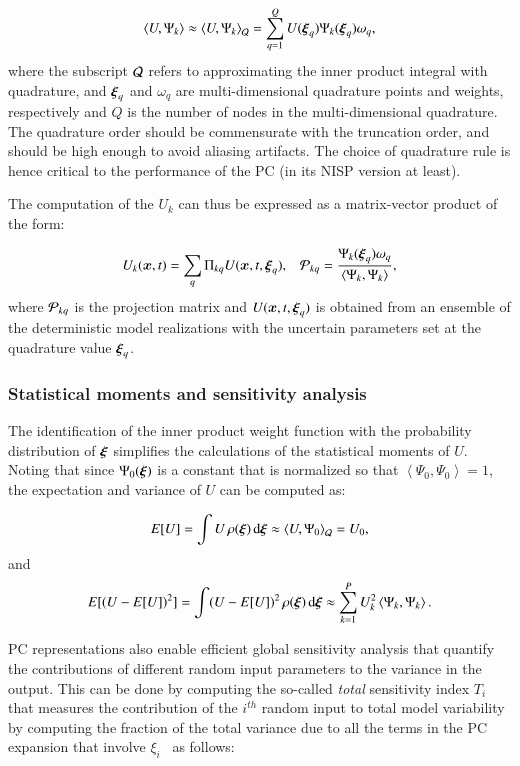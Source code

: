 \begin{equation}
  \left< U, \Psi_k \right> 
\approx \left< U, \Psi_k \right>_{\cal Q}
= \sum_{q=1}^{Q} U(\xxi_q) \Psi_k(\xxi_q) \omega_q,
\end{equation}
where the subscript $\cal Q$ refers to approximating the inner product integral with
quadrature, and $\xxi_q$ and $\omega_q$ are multi-dimensional quadrature points and weights,
respectively and $Q$ is the number of nodes in the multi-dimensional quadrature. The quadrature order should be commensurate with the
truncation order, and should be high enough to avoid aliasing artifacts.
The choice of quadrature rule is hence critical to the performance
of the PC (in its NISP version at least).

The computation of the ${U}_k$ can thus be expressed as a matrix-vector product of the form:

\begin{equation} 
 U_k(\bm{x},t)=\sum_q \Pi_{kq} U(\bm{x},t,\xxi_q),\;\;\;
 {\cal P}_{kq}=\frac{\Psi_k(\xxi_q)\omega_q}{\left< \Psi_k, \Psi_k \right>},
\label{eq:nisp}
\end{equation} 
where ${\cal P}_{kq}$ is the projection matrix and $U(\bm{x},t,\xxi_q)$ is obtained
from an ensemble of the deterministic model realizations with the uncertain parameters set at
the quadrature value $\xxi_q$. 


\subsubsection{Statistical moments and sensitivity analysis}
The identification of the inner product weight function
with the probability distribution of $\xxi$ simplifies the calculations of the statistical moments of $U$. 
Noting that since $\Psi_0(\xxi)$ is a constant that is normalized so that 
$\left<\Psi_0,\Psi_0\right>=1$, the expectation and variance of $U$ can be computed as:

\begin{equation}
 E[U] = \int U \, \rho(\xxi) \, \mbox{d}\xxi \approx \left< U,\Psi_0\right>_{\cal Q} = U_0,  
 \label{eq:mean}
\end{equation}
and \begin{equation}
 E[(U-E[U])^2] = \int (U-E[U])^2 \, \rho(\xxi) \, \mbox{d}\xxi \approx \sum_{k=1}^P U_k^2
 \label{eq:sigma}
\left<\Psi_k,\Psi_k\right>.
\end{equation}

PC representations also enable
efficient global sensitivity analysis that quantify the
contributions of different random input parameters to the variance in the output.
This can be done by computing the so-called {\it total} 
sensitivity index $T_i$ that measures the contribution of
the $i^{th}$ random input to total model variability by
computing the fraction of the total variance due to all the terms in the
PC expansion that involve $\xi_i$~\citep{LeMaitreKnio2010,Crestaux,Sudret}
as follows:

